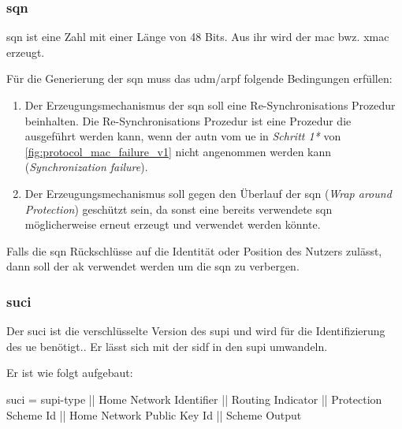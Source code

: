 \subsubsection{\gls{sqn}}
\gls{sqn} ist eine Zahl mit einer Länge von 48 Bits. %
Aus ihr wird der \gls{mac} bwz. \gls{xmac} erzeugt. %

Für die Generierung der \gls{sqn} muss das \gls{udm}/\gls{arpf} folgende Bedingungen erfüllen:\\%
\begin{enumerate}
\item Der Erzeugungsmechanismus der \gls{sqn} soll eine Re-Synchronisations Prozedur beinhalten.
Die Re-Synchronisations Prozedur ist eine Prozedur die ausgeführt werden kann, wenn der \gls{autn} vom \gls{ue} in \textit{Schritt 1*} von \cref{fig:protocol_mac_failure_v1} nicht angenommen werden kann (\textit{Synchronization failure}).
\item Der Erzeugungsmechanismus soll gegen den Überlauf der \gls{sqn} (\textit{Wrap around Protection}) geschützt sein, da sonst eine bereits verwendete \gls{sqn} möglicherweise erneut erzeugt und verwendet werden könnte. 
\end{enumerate}

Falls die \gls{sqn} Rückschlüsse auf die Identität oder Position des Nutzers zulässt, dann soll der \gls{ak} verwendet werden um die \gls{sqn} zu verbergen.

\subsubsection{\gls{suci}}
Der \gls{suci} ist die verschlüsselte Version des \gls{supi} und wird für die Identifizierung des \gls{ue} benötigt..
Er lässt sich mit der \gls{sidf} in den \gls{supi} umwandeln.

Er ist wie folgt aufgebaut: %

\gls{suci} = \gls{supi-type} || Home Network Identifier || Routing Indicator || Protection Scheme Id || Home Network Public Key Id || Scheme Output

